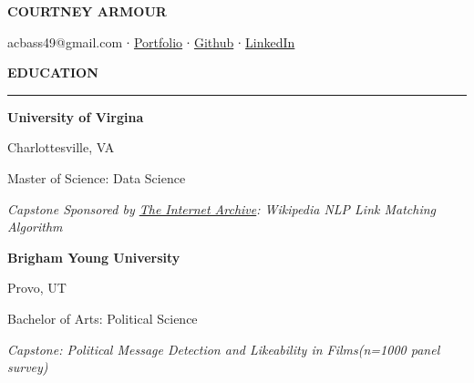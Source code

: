 \documentclass[
  16,
]{article}
\author{}
\date{}
\begin{document}
\ifdefined\Shaded\renewenvironment{Shaded}{\begin{tcolorbox}[enhanced, breakable, frame hidden, boxrule=0pt, borderline west={3pt}{0pt}{shadecolor}, sharp corners, interior hidden]}{\end{tcolorbox}}\fi

\begin{huge}\begin{center}{\bf COURTNEY ARMOUR}\end{center}\end{huge}

\begin{center}acbass49@gmail.com ∙ \href{https://alexbass.me/blog.html#category=Project}{Portfolio} ∙ \href{https://github.com/acbass49}{Github} ∙ \href{https://www.linkedin.com/in/alex-bass-4a7465161/}{LinkedIn}
\end{center}
\vspace{15pt}

\begin{large}
  {\bf EDUCATION}
  \vspace{3pt}
  \hrule
  \begin{multicols}{2}
    \begin{flushleft}{\bf University of Virgina}\end{flushleft}
    \begin{flushright}Charlottesville, VA\end{flushright}
  \end{multicols}
  \vspace{-0.17cm}
  \begin{multicols}{2}
    \begin{flushleft}Master of Science: Data Science\end{flushleft}
  \end{multicols}
  \vspace{-0.25cm}
  \textit{Capstone Sponsored by \href{https://archive.org/}{The Internet Archive}: Wikipedia NLP Link Matching Algorithm}
\end{large}

\vspace{0.2cm}

\begin{large}
  \begin{multicols}{2}
    \begin{flushleft}{\bf Brigham Young University}\end{flushleft}
    \begin{flushright}Provo, UT\end{flushright}
  \end{multicols}
  \vspace{-0.17cm}
  \begin{multicols}{2}
    \begin{flushleft}Bachelor of Arts: Political Science\end{flushleft}
  \end{multicols}
  \vspace{-0.25cm}
  \textit{Capstone: Political Message Detection and Likeability in Films(n=1000 panel survey)}
\end{large}
\vspace{3pt}
\end{document}
